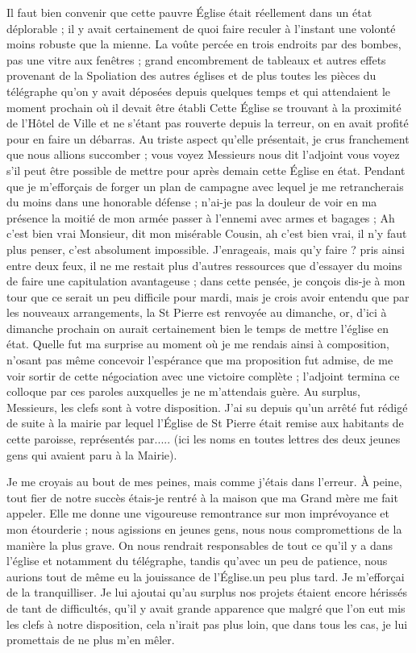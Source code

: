 \documentclass[11pt,a4paper]{report}
\begin{document}
Il faut bien convenir que cette pauvre Église était réellement dans un état déplorable ; il y avait certainement de quoi faire reculer à l'instant une volonté moins robuste que la mienne. La voûte percée en trois endroits par des bombes, pas une vitre aux fenêtres ; grand encombrement de tableaux et autres effets provenant de la Spoliation des autres églises et de plus toutes les pièces du télégraphe qu'on y avait déposées depuis quelques temps et qui attendaient le moment prochain où il devait être établi Cette Église se trouvant à la proximité de l'Hôtel de Ville et ne s'étant pas rouverte depuis la terreur, on en avait profité pour en faire un débarras. Au triste aspect qu'elle présentait, je crus franchement que nous allions succomber ; vous voyez Messieurs nous dit l'adjoint vous voyez s'il peut être possible de mettre pour après demain cette Église en état. Pendant que je m'efforçais de forger un plan de campagne avec lequel je me retrancherais du moins dans une honorable défense ; n'ai-je pas la douleur de voir en ma présence la moitié de mon armée passer à l'ennemi avec armes et bagages ; Ah c'est bien vrai Monsieur, dit mon misérable Cousin, ah c'est bien vrai, il n'y faut plus penser, c'est absolument impossible. J'enrageais, mais qu'y faire ? pris ainsi entre deux feux, il ne me restait plus d'autres ressources que d'essayer du moins de faire une capitulation avantageuse ; dans cette pensée, je conçois dis-je à mon tour que ce serait un peu difficile pour mardi, mais je crois avoir entendu que par les nouveaux arrangements, la St Pierre est renvoyée au dimanche, or, d'ici à dimanche prochain on aurait certainement bien le temps de mettre l'église en état. Quelle fut ma surprise au moment où je me rendais ainsi à composition, n'osant pas même concevoir l'espérance que ma proposition fut admise, de me voir sortir de cette négociation avec une victoire complète ; l'adjoint termina ce colloque par ces paroles auxquelles je ne m'attendais guère. Au surplus, Messieurs, les clefs sont à votre disposition. J'ai su depuis qu'un arrêté fut rédigé de suite à la mairie par lequel l'Église de St Pierre était remise aux habitants de cette paroisse, représentés par..... (ici les noms en toutes lettres des deux jeunes gens qui avaient paru à la Mairie).

Je me croyais au bout de mes peines, mais comme j'étais dans l'erreur. À peine, tout fier de notre succès étais-je rentré à la maison que ma Grand mère me fait appeler. Elle me donne une vigoureuse remontrance sur mon imprévoyance et mon étourderie ; nous agissions en jeunes gens, nous nous compromettions de la manière la plus grave. On nous rendrait responsables de tout ce qu'il y a dans l'église et notamment du télégraphe, tandis qu'avec un peu de patience, nous aurions tout de même eu la jouissance de l'Église.un peu plus tard. Je m'efforçai de la tranquilliser. Je lui ajoutai qu'au surplus nos projets étaient encore hérissés de tant de difficultés, qu'il y avait grande apparence que malgré que l'on eut mis les clefs à notre disposition, cela n'irait pas plus loin, que dans tous les cas, je lui promettais de ne plus m'en mêler.
\end{document}
